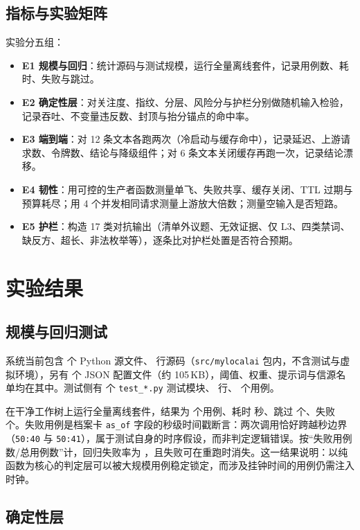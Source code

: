 \documentclass[12pt,a4paper,fontset=windows]{ctexart}
\begin{document}
\subsection{指标与实验矩阵}

实验分五组：
\begin{itemize}
  \item \textbf{E1 规模与回归}：统计源码与测试规模，运行全量离线套件，记录用例数、耗时、失败与跳过。
  \item \textbf{E2 确定性层}：对关注度、指纹、分层、风险分与护栏分别做随机输入检验，记录吞吐、不变量违反数、封顶与抬分锚点的命中率。
  \item \textbf{E3 端到端}：对 12 条文本各跑两次（冷启动与缓存命中），记录延迟、上游请求数、令牌数、结论与降级组件；对 6 条文本关闭缓存再跑一次，记录结论漂移。
  \item \textbf{E4 韧性}：用可控的生产者函数测量单飞、失败共享、缓存关闭、TTL 过期与预算耗尽；用 4 个并发相同请求测量上游放大倍数；测量空输入是否短路。
  \item \textbf{E5 护栏}：构造 17 类对抗输出（清单外议题、无效证据、仅 L3、四类禁词、缺反方、超长、非法枚举等），逐条比对护栏处置是否符合预期。
\end{itemize}

\section{实验结果}\label{sec:results}

\subsection{规模与回归测试}

系统当前包含 \CodeFiles{} 个 Python 源文件、\CodeLOC{} 行源码（\texttt{src/mylocalai} 包内，不含测试与虚拟环境），另有 \JsonFiles{} 个 JSON 配置文件（约 105\,KB），阈值、权重、提示词与信源名单均在其中。测试侧有 \TestFiles{} 个 \texttt{test\_*.py} 测试模块、\TestLOC{} 行、\TestCases{} 个用例。

在干净工作树上运行全量离线套件，结果为 \TestCases{} 个用例、耗时 \TestTime{} 秒、跳过 \TestSkip{} 个、失败 \TestFail{} 个。失败用例是档案卡 \texttt{as\_of} 字段的秒级时间戳断言：两次调用恰好跨越秒边界（\texttt{50:40} 与 \texttt{50:41}），属于测试自身的时序假设，而非判定逻辑错误。按“失败用例数/总用例数”计，回归失败率为 \TestFailRate，且失败可在重跑时消失。这一结果说明：以纯函数为核心的判定层可以被大规模用例稳定锁定，而涉及挂钟时间的用例仍需注入时钟。

\subsection{确定性层}
\end{document}
